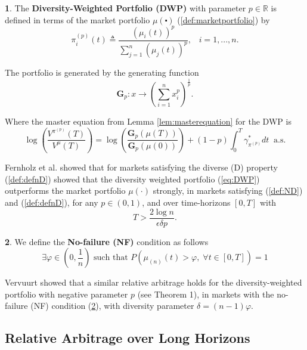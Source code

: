 \documentclass[british]{amsart} \usepackage{lmodern}
\numberwithin{equation}{section} \numberwithin{figure}{section}
\theoremstyle{plain} \newtheorem{thm}{\protect\theoremname}[section]
\theoremstyle{definition} \newtheorem{defn}[thm]{\protect\definitionname}
\theoremstyle{plain} \newtheorem{assumption}[thm]{\protect\assumptionname}
\theoremstyle{plain} \newtheorem{lem}[thm]{\protect\lemmaname}
\theoremstyle{plain} \newtheorem{prop}[thm]{\protect\propositionname}
\theoremstyle{remark} \newtheorem{rem}[thm]{\protect\remarkname}
\theoremstyle{plain} \newtheorem{cor}[thm]{\protect\corollaryname}
\begin{document}
\begin{defn}
The \textbf{Diversity-Weighted Portfolio (DWP) }with parameter $p\in\mathbb{R}$
is defined in terms of the market portfolio $\mu(\centerdot)$ (\ref{def:marketportfolio})
by
\begin{equation}
\pi_{i}^{(p)}(t)\triangleq\frac{\left(\mu_{i}(t)\right)^{p}}{\sum_{j=1}^{n}\left(\mu_{j}(t)\right)^{p}},\;\;\;i=1,...,n.\label{eq:DWP}
\end{equation}

The portfolio is generated by the generating function
\begin{equation}
\mathbf{G}_{p}:x\to\left(\sum_{i=1}^{n}x_{i}^{p}\right)^{\frac{1}{p}}.
\end{equation}

Where the master equation from Lemma \ref{lem:masterequation} for the DWP
is
\begin{equation}
\log\left(\frac{V^{\pi^{(p)}}(T)}{V^{\mu}(T)}\right)=\log\left(\frac{\mathbf{G}_{p}(\mu(T))}{\mathbf{G}_{p}(\mu(0))}\right)+(1-p)\int_{0}^{T}\gamma_{\pi^{(p)}}^{*}dt\;\;\text{a.s.}
\end{equation}
\end{defn}
Fernholz et al. \cite{fernholz2005} showed that for markets satisfying
the diverse (D) property (\ref{def:defnD}) showed that the diversity
weighted portfolio (\ref{eq:DWP}) outperforms the market portfolio
$\mu(\cdot)$ strongly, in markets satisfying (\ref{def:ND}) and
(\ref{def:defnD}), for any $p\in(0,1)$, and over time-horizons $[0,T]$
with
\begin{equation}
T>\frac{2\log n}{\epsilon\delta p}.
\end{equation}

\begin{defn}
\label{def:NF}We define the \textbf{No-failure (NF) }condition as
follows
\begin{equation}
\exists\varphi\in(0,\frac{1}{n})\text{ such that }P\left(\mu_{(n)}(t)>\varphi,\;\forall t\in[0,T]\right)=1
\end{equation}

Vervuurt \cite{vervuurt2015} showed that a similar relative arbitrage
holds for the diversity-weighted portfolio with negative parameter
$p$ (see Theorem 1\cite{vervuurt2015}), in markets with the no-failure
(NF) condition (\ref{def:NF}), with diversity parameter $\delta=(n-1)\varphi$.
\end{defn}
%

\subsection{Relative Arbitrage over Long Horizons}
\end{document}
